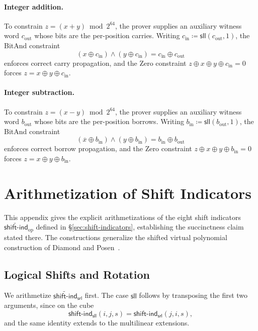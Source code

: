\documentclass{article}
\theoremstyle{definition}
\newcommand*{\mle}{\widetilde}
\begin{document}
\paragraph{Integer addition.}
To constrain $z = (x + y) \bmod 2^{64}$, the prover supplies an auxiliary witness word $c_\text{out}$ whose bits are the per-position carries. Writing $c_\text{in} \coloneqq \textsf{sll}(c_\text{out}, 1)$, the BitAnd constraint
\[
  (x \oplus c_\text{in}) \land (y \oplus c_\text{in}) = c_\text{in} \oplus c_\text{out}
\]
enforces correct carry propagation, and the Zero constraint $z \oplus x \oplus y \oplus c_\text{in} = 0$ forces $z = x \oplus y \oplus c_\text{in}$.

\paragraph{Integer subtraction.}
To constrain $z = (x - y) \bmod 2^{64}$, the prover supplies an auxiliary witness word $b_\text{out}$ whose bits are the per-position borrows. Writing $b_\text{in} \coloneqq \textsf{sll}(b_\text{out}, 1)$, the BitAnd constraint
\[
  (\overline{x} \oplus b_\text{in}) \land (y \oplus b_\text{in}) = b_\text{in} \oplus b_\text{out}
\]
enforces correct borrow propagation, and the Zero constraint $z \oplus x \oplus y \oplus b_\text{in} = 0$ forces $z = x \oplus y \oplus b_\text{in}$.

\section{Arithmetization of Shift Indicators}
\label{app:shift-arithmetizations}

This appendix gives the explicit arithmetizations of the eight shift indicators $\mle{\textsf{shift-ind}}_\text{op}$ defined in \S\ref{sec:shift-indicators}, establishing the succinctness claim stated there. The constructions generalize the shifted virtual polynomial construction of Diamond and Posen~\cite[\S 4.3]{Diamond:2025aa}.

\subsection{Logical Shifts and Rotation}
\label{sec:logical-shifts}

We arithmetize $\mle{\textsf{shift-ind}}_\textsf{srl}$ first. The case $\textsf{sll}$ follows by transposing the first two arguments, since on the cube
\[
  \textsf{shift-ind}_\textsf{sll}(i, j, s) = \textsf{shift-ind}_\textsf{srl}(j, i, s),
\]
and the same identity extends to the multilinear extensions.
\end{document}
